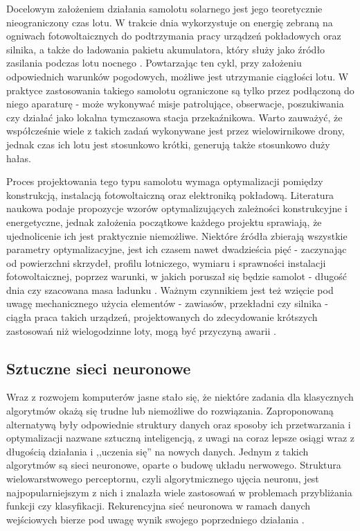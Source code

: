 \documentclass[12pt, a4paper]{article}
\begin{document}
Docelowym założeniem działania samolotu solarnego jest jego teoretycznie nieograniczony czas lotu. W trakcie dnia wykorzystuje on energię zebraną na ogniwach fotowoltaicznych do podtrzymania pracy urządzeń pokładowych oraz silnika, a także do ładowania pakietu akumulatora, który służy jako źródło zasilania podczas lotu nocnego \cite{IEEE2013}. Powtarzając ten cykl, przy założeniu odpowiednich warunków pogodowych, możliwe jest utrzymanie ciągłości lotu. W praktyce zastosowania takiego samolotu ograniczone są tylko przez podłączoną do niego aparaturę - może wykonywać misje patrolujące, obserwacje, poszukiwania czy działać jako lokalna tymczasowa stacja przekaźnikowa. Warto zauważyć, że współcześnie wiele z takich zadań wykonywane jest przez wielowirnikowe drony, jednak  czas ich lotu jest stosunkowo krótki, generują także stosunkowo duży hałas.

Proces projektowania tego typu samolotu wymaga optymalizacji pomiędzy konstrukcją, instalacją fotowoltaiczną oraz elektroniką pokładową. Literatura naukowa podaje propozycje wzorów optymalizujących zależności konstrukcyjne i energetyczne, jednak założenia początkowe każdego projektu sprawiają, że ujednolicenie ich jest praktycznie niemożliwe. Niektóre źródła zbierają wszystkie parametry optymalizacyjne, jest ich czasem nawet dwadzieścia pięć - zaczynając od powierzchni skrzydeł, profilu lotniczego, wymiaru i sprawności instalacji fotowoltaicznej, poprzez warunki, w jakich poruszał się będzie samolot - długość dnia czy szacowana masa ładunku \cite{IEEE2013}. Ważnym czynnikiem jest też wzięcie pod uwagę mechanicznego użycia elementów - zawiasów, przekładni czy silnika - ciągła praca takich urządzeń, projektowanych do zdecydowanie krótszych zastosowań niż wielogodzinne loty, mogą być przyczyną awarii \cite{devasol}. 

\subsection{Sztuczne sieci neuronowe}
Wraz z rozwojem komputerów jasne stało się, że niektóre zadania dla klasycznych algorytmów okażą się trudne lub niemożliwe do rozwiązania. Zaproponowaną alternatywą były odpowiednie struktury danych oraz sposoby ich przetwarzania i optymalizacji nazwane sztuczną inteligencją, z uwagi na coraz lepsze osiągi wraz z długością działania i ,,uczenia się'' na nowych danych. Jednym z takich algorytmów są sieci neuronowe, oparte o budowę układu nerwowego. Struktura wielowarstwowego perceptornu, czyli algorytmicznego ujęcia neuronu, jest najpopularniejszym z nich i znalazła wiele zastosowań w problemach przybliżania funkcji czy klasyfikacji. Rekurencyjna sieć neuronowa w ramach danych wejściowych bierze pod uwagę wynik swojego poprzedniego działania \cite{wikimlp}.
\end{document}
